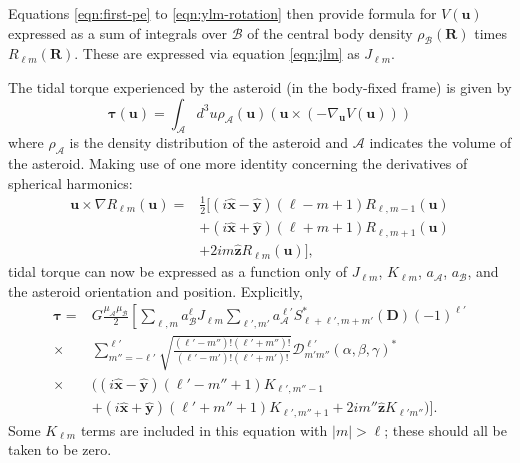 \documentclass[fleqn,usenatbib]{mnras}
\newcommand{\unit}[1]{\bm{\hat{#1}}}
\begin{document}
Equations \ref{eqn:first-pe} to \ref{eqn:ylm-rotation} then provide formula for $V(\bm u)$ expressed as a sum of integrals over $\mathcal{B}$ of the central body density $\rho_\mathcal{B}(\bm R)$ times $R_{\ell m}(\bm R)$. These are expressed via equation \ref{eqn:jlm} as $J_{\ell m}$.

The tidal torque experienced by the asteroid (in the body-fixed frame) is given by
\begin{equation}
  \bm{\tau}(\bm u) = \int_\mathcal{A} d^3 u \rho_\mathcal{A}(\bm u) (\bm u \times (-\nabla_{\bm u} V(\bm u)))
\end{equation}
where $\rho_\mathcal{A}$ is the density distribution of the asteroid and $\mathcal{A}$ indicates the volume of the asteroid. Making use of one more identity concerning the derivatives of spherical harmonics:
\begin{equation}
  \begin{split}
  \bm u \times \nabla R_{\ell m}(\bm u)=&\frac{1}{2}\Big[(i\unit x - \unit y)(\ell-m+1)R_{\ell,m-1}(\bm u)\\
  &+(i\unit x+\unit y)(\ell+m+1)R_{\ell,m+1}(\bm u)\\
  & +2im\unit z R_{\ell m}(\bm u)\Big],
  \end{split}
\end{equation}
tidal torque can now be expressed as a function only of $J_{\ell m}$, $K_{\ell m}$, $a_\mathcal{A}$, $a_\mathcal{B}$, and the asteroid orientation and position. Explicitly,
\begin{equation}
  \begin{split}
  \bm \tau = & G\frac{\mu_\mathcal{A}\mu_\mathcal{B}}{2}\left[\sum_{\ell, m} a_\mathcal{B}^\ell J_{\ell m} \sum_{\ell', m'}a_\mathcal{A}^{\ell'}S^*_{\ell+\ell', m + m'} (\bm D) (-1)^{\ell'}\right.\\
  \times & \left.\sum_{m''=-\ell'}^{\ell'} \sqrt{\frac{(\ell'-m'')!(\ell'+m'')!}{(\ell'-m')!(\ell'+m')!}}  \mathcal{D}^{\ell'}_{m'm''}(\alpha, \beta, \gamma)^* \right. \\
  \times & \Big((i\unit x - \unit y)(\ell'-m''+1)K_{\ell',m''-1} \\
  & +(i\unit x+\unit y)(\ell'+m''+1)K_{\ell',m''+1}+2im''\unit z K_{\ell'm''}\Big) \Bigg].
  \end{split}
  \label{eqn:tidal-torque}
\end{equation}
Some $K_{\ell m}$ terms are included in this equation with $|m|>\ell$; these should all be taken to be zero.
\end{document}
